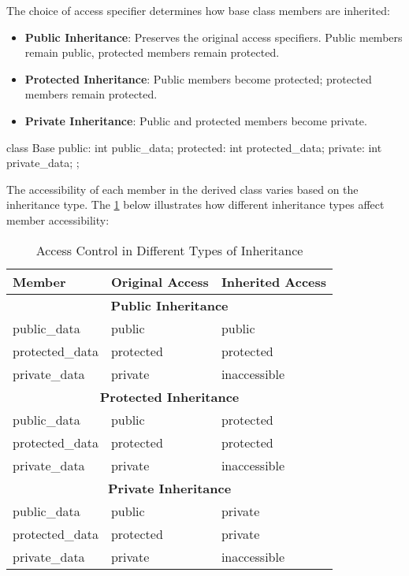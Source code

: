 The choice of access specifier determines how base class members are inherited:

\begin{itemize}
    \item \textbf{Public Inheritance}: Preserves the original access specifiers. Public members remain public, protected members remain protected.
    \item \textbf{Protected Inheritance}: Public members become protected; protected members remain protected.
    \item \textbf{Private Inheritance}: Public and protected members become private.
\end{itemize}

\begin{codeblock}[language=C++]
class Base {
public:
    int public_data;
protected:
    int protected_data;
private:
    int private_data;
};
\end{codeblock}

The accessibility of each member in the derived class varies based on the inheritance type. The \cref{tab:inheritance_access} below illustrates how different inheritance types affect member accessibility:

\renewcommand{\arraystretch}{1}  %
\begin{table}[H]
    \centering
    \small
    \begin{tabular}{|p{3.5cm}|p{3.5cm}|p{3.5cm}|}
        \hline
        \textbf{Member} & \textbf{Original Access} & \textbf{Inherited Access} \\
        \hline
        \multicolumn{3}{|c|}{\textbf{Public Inheritance}} \\
        \hline
        public\_data & public & public \\
        protected\_data & protected & protected \\
        private\_data & private & inaccessible \\
        \hline
        \multicolumn{3}{|c|}{\textbf{Protected Inheritance}} \\
        \hline
        public\_data & public & protected \\
        protected\_data & protected & protected \\
        private\_data & private & inaccessible \\
        \hline
        \multicolumn{3}{|c|}{\textbf{Private Inheritance}} \\
        \hline
        public\_data & public & private \\
        protected\_data & protected & private \\
        private\_data & private & inaccessible \\
        \hline
    \end{tabular}
    \caption{Access Control in Different Types of Inheritance}
    \label{tab:inheritance_access}
\end{table}

